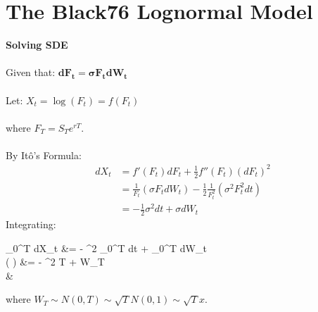\documentclass{article}
\begin{document}
\newpage


\section{The Black76 Lognormal Model}
\begin{minipage}[t]{0.5\textwidth}
	\begin{tcolorbox}[height=12.4cm,boxsep=5pt,arc=0pt,auto outer arc,colback=white,colframe=black]
		\noindent \textbf{Solving SDE}\\ \\
		\noindent Given that: $\boldsymbol{dF_t = \sigma F_t dW_t}$\\ \\
		\noindent Let: $X_t = \log (F_t) = f(F_t)$\\ \\
		\noindent where $F_T = S_T e^{rT}$.\\ \\
		\noindent By Itô's Formula:
		\begin{align*}
		dX_t &= f'(F_t) dF_t + \frac{1}{2} f''(F_t) (dF_t)^2\\
		&= \frac{1}{F_t} (\sigma F_t dW_t) - \frac{1}{2} \frac{1}{F_t^2} (\sigma^2 F_t^2 dt)\\
		&= -\frac{1}{2} \sigma^2 dt + \sigma dW_t
		\end{align*}
		\noindent Integrating:
		\begin{flalign*}
		\int_{0}^{T} dX_t &= -  \sigma^2 \int_{0}^{T} dt +  \sigma \int_{0}^{T} dW_t\\
		\log \left(  \right) &= - \sigma^2 T + \sigma W_T\\
		&
		\end{flalign*}
		\noindent where $W_T \sim N(0,T) \sim \sqrt{T} N(0,1) \sim \sqrt{T} x$.
	\end{tcolorbox}
\end{minipage}
\end{document}
